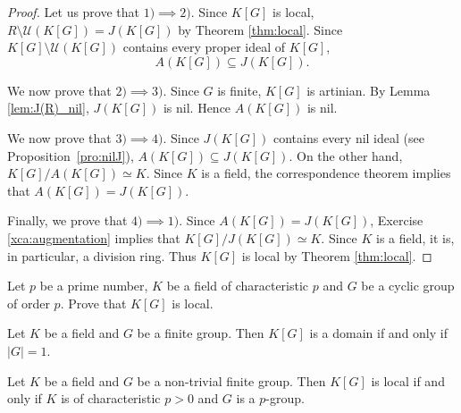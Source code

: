 \begin{proof}
    Let us prove that $1)\implies 2)$. Since $K[G]$ is local, 
    $R\setminus\mathcal{U}(K[G])=J(K[G])$ by Theorem \ref{thm:local}. Since $K[G]\setminus\mathcal{U}(K[G])$ contains 
    every proper ideal of $K[G]$, 
    \[
    A(K[G])\subseteq J(K[G]).
    \]

    We now prove that $2)\implies 3)$. Since $G$ is finite, $K[G]$ is artinian. By Lemma \ref{lem:J(R)_nil}, 
    $J(K[G])$ is nil. Hence $A(K[G])$ is nil. 

    We now prove that $3)\implies 4)$. Since $J(K[G])$ contains every nil ideal (see Proposition~\ref{pro:nilJ}), 
    $A(K[G])\subseteq J(K[G])$. On the other hand, $K[G]/A(K[G])\simeq K$. Since $K$ is a field, the correspondence theorem
    implies that $A(K[G])=J(K[G])$. 

    Finally, we prove that $4)\implies 1)$. Since $A(K[G])=J(K[G])$, Exercise \ref{xca:augmentation} implies that 
    $K[G]/J(K[G])\simeq K$. Since $K$ is a field, 
    it is, in particular, a division ring. Thus $K[G]$ is local by Theorem \ref{thm:local}.     
\end{proof}


\begin{exercise}
\label{xca:C_p:local}
    Let $p$ be a prime number, $K$ be a field of characteristic $p$ and 
    $G$ be a cyclic group of order $p$. Prove that $K[G]$ is local. 
\end{exercise}


\begin{exercise}
\label{xca:K[G]_domain_easy}
    Let $K$ be a field and $G$ be a finite group. Then 
    $K[G]$ is a domain if and only if $|G|=1$. 
\end{exercise}


\begin{theorem}
    Let $K$ be a field and $G$ be a non-trivial finite group. 
    Then $K[G]$ is local if and only if $K$ is of characteristic $p>0$ and $G$ is a $p$-group. 
\end{theorem}

